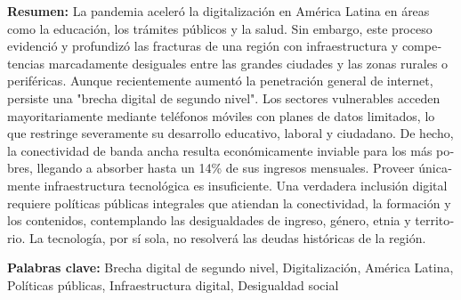 \begin{tcolorbox}[colback=brown!8!white,colframe=brown!8!white,boxrule=0pt,arc=2pt,left=4pt,right=4pt,top=3pt,bottom=3pt,before skip=4pt,after skip=4pt]
\begin{otherlanguage}{spanish}
\sffamily\small \textbf{Resumen:} La pandemia aceleró la digitalización en América Latina en áreas como la educación, los trámites públicos y la salud. Sin embargo, este proceso evidenció y profundizó las fracturas de una región con infraestructura y competencias marcadamente desiguales entre las grandes ciudades y las zonas rurales o periféricas.
Aunque recientemente aumentó la penetración general de internet, persiste una "brecha digital de segundo nivel". Los sectores vulnerables acceden mayoritariamente mediante teléfonos móviles con planes de datos limitados, lo que restringe severamente su desarrollo educativo, laboral y ciudadano. De hecho, la conectividad de banda ancha resulta económicamente inviable para los más pobres, llegando a absorber hasta un 14\% de sus ingresos mensuales.
Proveer únicamente infraestructura tecnológica es insuficiente. Una verdadera inclusión digital requiere políticas públicas integrales que atiendan la conectividad, la formación y los contenidos, contemplando las desigualdades de ingreso, género, etnia y territorio. La tecnología, por sí sola, no resolverá las deudas históricas de la región.
\par\smallskip\noindent\textbf{Palabras clave:} Brecha digital de segundo nivel, Digitalización, América Latina, Políticas públicas, Infraestructura digital, Desigualdad social
\end{otherlanguage}
\end{tcolorbox}

